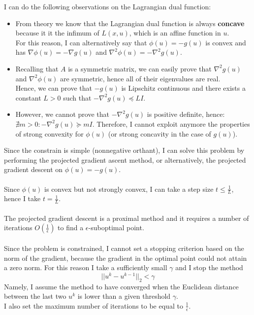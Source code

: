 \documentclass[]{article}
\begin{document}
I can do the following observations on the Lagrangian dual function:
\begin{itemize}
	\item From theory we know that the Lagrangian dual function is always \textbf{concave} because it it the infimum of $L(x,u)$, which is an affine function in $u$.\\
	For this reason, I can alternatively say that $\phi(u) = -g(u)$ is convex and has $\nabla \phi(u) = -\nabla g(u)$ and $\nabla^2 \phi(u) = -\nabla^2 g(u)$.
	\item Recalling that $A$ is a symmetric matrix, we can easily prove that $ \nabla^2 g(u)$ and $\nabla^2 \phi(u)$ are symmetric, hence all of their eigenvalues are real.\\
	Hence, we can prove that $-g(u)$ is Lipschitz continuous and there exists a constant $L>0$ such that $-\nabla^2 g(u) \preceq LI$.
	\item However, we cannot prove that $-\nabla^2 g(u)$ is positive definite, hence:\\
	$\nexists m>0: -\nabla^2 g(u) \succeq mI$. Therefore, I cannot exploit anymore the properties of strong convexity for $\phi(u)$ (or strong concavity in the case of $g(u)$).
\end{itemize}
Since the constrain is simple (nonnegative orthant), I can solve this problem by performing the projected gradient ascent method, or alternatively, the projected gradient descent on $\phi(u) = -g(u)$.\\\\
Since $\phi(u)$ is convex but not strongly convex, I can take a step size $t \leq \frac{1}{L}$, hence I take $t = \frac{1}{L}$.\\\\
The projected gradient descent is a proximal method and it requires a number of iterations $O(\frac{1}{\epsilon})$ to find a $\epsilon$-suboptimal point.\\\\
Since the problem is constrained, I cannot set a stopping criterion based on the norm of the gradient, because the gradient in the optimal point could not attain a zero norm. For this reason I take a sufficiently small $\gamma$ and I stop the method 
\[
||u^k-u^{k-1}||_2 < \gamma
\]
Namely, I assume the method to have converged when the Euclidean distance between the last two $u^k$ is lower than a given threshold $\gamma$.\\
I also set the maximum number of iterations to be equal to $\frac{1}{\epsilon}$.\\
\end{document}
